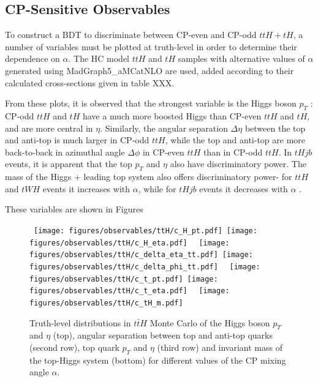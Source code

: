 \subsection{CP-Sensitive Observables}

To construct a BDT to discriminate between CP-even and CP-odd $ttH+tH$, a number of variables must be plotted at truth-level in order to determine their dependence on $\alpha$. The HC model $ttH$ and $tH$ samples with alternative values of $\alpha$ generated using MadGraph5_aMCatNLO are used, added according to their calculated cross-sections given in table XXX.

From these plots, it is observed that the strongest variable is the Higgs boson $p_{T}$ : CP-odd $ttH$ and $tH$ have a much more boosted Higgs than CP-even $ttH$ and $tH$, and are more central in $\eta$. Similarly, the angular separation $\Delta \eta$ between the top and anti-top is much larger in CP-odd $ttH$, while the top and anti-top are more back-to-back in azimuthal angle $\Delta \phi$ in CP-even $ttH$ than in CP-odd $ttH$. In $tHjb$ events, it is apparent that the top $p_{T}$ and $\eta$ also have discriminatory power. The mass of the Higgs + leading top system also offers discriminatory power- for $ttH$ and $tWH$ events it increases with $\alpha$, while for $tHjb$ events it decreases with $\alpha$ .

These variables are shown in Figures


\begin{figure}[!ht] 
  \begin{center}
    \mbox{ 
      \texttt{[image: figures/observables/ttH/c\_H\_pt.pdf]}
      \texttt{[image: figures/observables/ttH/c\_H\_eta.pdf]}
    }
    \mbox{ 
      \texttt{[image: figures/observables/ttH/c\_delta\_eta\_tt.pdf]}
      \texttt{[image: figures/observables/ttH/c\_delta\_phi\_tt.pdf]}
    }
    \mbox{ 
      \texttt{[image: figures/observables/ttH/c\_t\_pt.pdf]}
      \texttt{[image: figures/observables/ttH/c\_t\_eta.pdf]}
    }
    \mbox{ 
      \texttt{[image: figures/observables/ttH/c\_tH\_m.pdf]}
    }
  \end{center}
  \caption{Truth-level distributions in $t\bar{t}H$ Monte Carlo of the Higgs boson $p_{T}$ and $\eta$ (top), angular separation between top and anti-top quarks (second row), top quark $p_{T}$ and $\eta$ (third row) and invariant mass of the top-Higgs system (bottom) for different values of the CP mixing angle $\alpha$.}
  \label{fig:ttH_truth}
\end{figure}

